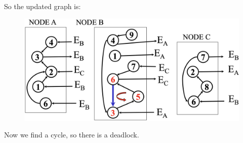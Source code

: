 \documentclass[12pt, a4paper]{report}
\newtheorem[style=M,bodystyle=\normalfont]{theorem}{Theorem}
\newtheorem[style=M,bodystyle=\normalfont]{corollary}{Corollary}
\newtheorem[style=M,bodystyle=\normalfont]{lemma}{Lemma}
\newtheorem[style=M,bodystyle=\normalfont]{definition}{Definition}
\begin{document}
\begin{Answer}[ref=13]
\begin{itemize}
    \end{itemize}
    So the updated graph is: 
    \begin{figure}[H]
        \centering
        \includegraphics[width=1\linewidth]{images/Ob3.png}
    \end{figure}
    Now we find a cycle, so there is a deadlock. 
\end{Answer}

\newpage
\end{document}
